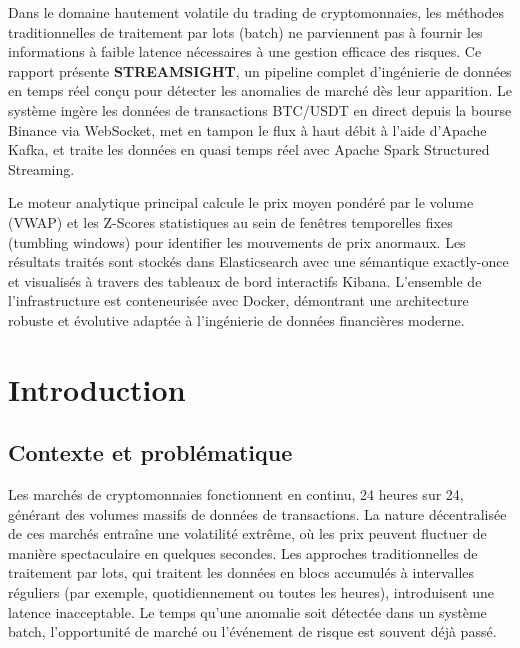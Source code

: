 \documentclass[12pt, a4paper]{article}
\begin{document}
\thispagestyle{plain}

\begin{infobox}[title=R\'esum\'e]
    \noindent 
    Dans le domaine hautement volatile du trading de cryptomonnaies, les m\'ethodes traditionnelles de traitement par lots (batch) ne parviennent pas \`a fournir les informations \`a faible latence n\'ecessaires \`a une gestion efficace des risques. Ce rapport pr\'esente \textbf{STREAMSIGHT}, un pipeline complet d'ing\'enierie de donn\'ees en temps r\'eel con\c{c}u pour d\'etecter les anomalies de march\'e d\`es leur apparition. Le syst\`eme ingère les donn\'ees de transactions BTC/USDT en direct depuis la bourse Binance via WebSocket, met en tampon le flux \`a haut d\'ebit \`a l'aide d'Apache Kafka, et traite les donn\'ees en quasi temps r\'eel avec Apache Spark Structured Streaming.
    
    \vspace{6pt}
    Le moteur analytique principal calcule le prix moyen pond\'er\'e par le volume (VWAP) et les Z-Scores statistiques au sein de fen\^etres temporelles fixes (tumbling windows) pour identifier les mouvements de prix anormaux. Les r\'esultats trait\'es sont stock\'es dans Elasticsearch avec une s\'emantique exactly-once et visualis\'es \`a travers des tableaux de bord interactifs Kibana. L'ensemble de l'infrastructure est conteneuris\'ee avec Docker, d\'emontrant une architecture robuste et \'evolutive adapt\'ee \`a l'ing\'enierie de donn\'ees financi\`eres moderne.
\end{infobox}

\newpage
\tableofcontents
\newpage

\section{Introduction}

\subsection{Contexte et probl\'ematique}
Les march\'es de cryptomonnaies fonctionnent en continu, 24 heures sur 24, g\'en\'erant des volumes massifs de donn\'ees de transactions. La nature d\'ecentralis\'ee de ces march\'es entra\^ine une volatilit\'e extr\^eme, o\`u les prix peuvent fluctuer de mani\`ere spectaculaire en quelques secondes. Les approches traditionnelles de traitement par lots, qui traitent les donn\'ees en blocs accumul\'es \`a intervalles r\'eguliers (par exemple, quotidiennement ou toutes les heures), introduisent une latence inacceptable. Le temps qu'une anomalie soit d\'etect\'ee dans un syst\`eme batch, l'opportunit\'e de march\'e ou l'\'ev\'enement de risque est souvent d\'ej\`a pass\'e.
\end{document}
